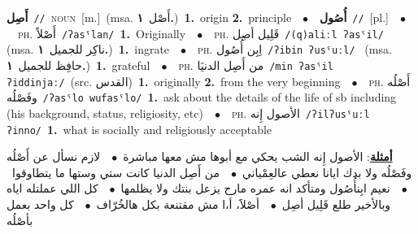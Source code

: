 \documentclass[10pt,a4paper,twoside]{article} %
\begin{document}
\begin{multicols}{2}
{\setlength\topsep{0pt}\textbf{\foreignlanguage{arabic}{أَصِل}}\ {\color{gray}\texttt{//}\color{black}}\ \textsc{noun}\ [m.]\ \color{gray}(msa. \foreignlanguage{arabic}{أَصْل}~\foreignlanguage{arabic}{\textbf{١.}})\color{black}\ \textbf{1.}~origin  \textbf{2.}~principle\ \ $\bullet$\ \ \setlength\topsep{0pt}\textbf{\foreignlanguage{arabic}{أُصُول}}\ {\color{gray}\texttt{//}\color{black}}\ [pl.]\ \ $\bullet$\ \ \textsc{ph.} \color{gray} \foreignlanguage{arabic}{أَصْلاً}\color{black}\ {\color{gray}\texttt{/{\sffamily ʔasˤlan}/}\color{black}}\ \textbf{1.}~Originally\ \ $\bullet$\ \ \textsc{ph.} \color{gray} \foreignlanguage{arabic}{قَلِيل أصِل}\color{black}\ {\color{gray}\texttt{/{\sffamily (q)aliːl ʔasˤil}/}\color{black}}\ \color{gray} (msa. \foreignlanguage{arabic}{ناكِر للجميل}~\foreignlanguage{arabic}{\textbf{١.}})\color{black}\ \textbf{1.}~ingrate\ \ $\bullet$\ \ \textsc{ph.} \color{gray} \foreignlanguage{arabic}{اِبِن أُصُول}\color{black}\ {\color{gray}\texttt{/{\sffamily ʔibin ʔusˤuːl}/}\color{black}}\ \color{gray} (msa. \foreignlanguage{arabic}{حافِظ للجميل}~\foreignlanguage{arabic}{\textbf{١.}})\color{black}\ \textbf{1.}~grateful\ \ $\bullet$\ \ \textsc{ph.} \color{gray} \foreignlanguage{arabic}{من أَصِل الدنيَا}\color{black}\ {\color{gray}\texttt{/{\sffamily min ʔasˤil ʔiddinjaː}/}\color{black}}\ \color{gray}(src. \foreignlanguage{arabic}{القدس})\color{black}\ \textbf{1.}~originally  \textbf{2.}~from the very beginning\ \ $\bullet$\ \ \textsc{ph.} \color{gray} \foreignlanguage{arabic}{أَصْلُه وفَصْلُه}\color{black}\ {\color{gray}\texttt{/{\sffamily ʔasˤlo wufasˤlo}/}\color{black}}\ \textbf{1.}~ask about the details of the life of sb including (his background, status, religiosity, etc)\ \ $\bullet$\ \ \textsc{ph.} \color{gray} \foreignlanguage{arabic}{الأصول إِنه}\color{black}\ {\color{gray}\texttt{/{\sffamily ʔilʔusˤuːl ʔinno}/}\color{black}}\ \textbf{1.}~what is socially and religiously acceptable\  \begin{flushright}\color{gray}\foreignlanguage{arabic}{\textbf{\underline{\foreignlanguage{arabic}{أمثلة}}}: الأصول إِنه الشب يحكي مع أبوها مش معها مباشرة\ $\bullet$\ \  لازم نسأل عن أَصْلُه وفَصْلُه ولا بدك ايانا نعطي عالعِمْياني\ $\bullet$\ \  من أَصِل الدنيا كانت ستي وستها ما يتطاوقوا\ $\bullet$\ \  نعيم ابِنأُصُول ومتأكد انه عمره مارح يزعل بنتك ولا يظلمها\ $\bullet$\ \  كل اللي عملتله اياه وبالأخير طلع قَلِيل أصِل\ $\bullet$\ \  أصْلاََ، أ،ا مش مقتنعة بكل هالخُرّاف\ $\bullet$\ \  كل واحد بعمل بأصْلُه}\end{flushright}\color{black}} \vspace{2mm}


\end{multicols}
\end{document}
